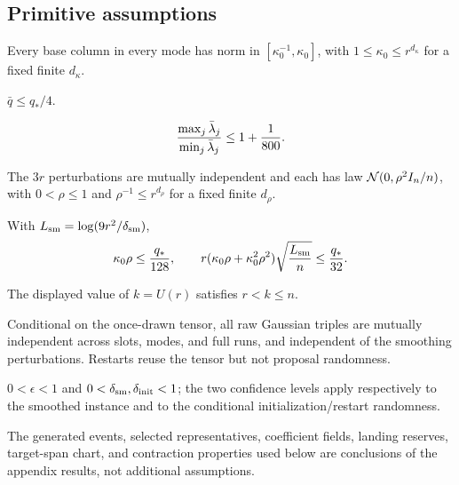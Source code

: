 \subsection{Primitive assumptions}

\begin{assumption}\label{assump:base-scale}
Every base column in every mode has norm in
$[\kappa _0^{-1},\kappa _0]$, with
$1\le\kappa _0\le r^{d_\kappa}$ for a fixed finite $d_\kappa$.
\end{assumption}

\begin{assumption}\label{assump:cumulative-gram}
$\bar q\le q_*/4$.
\end{assumption}

\begin{assumption}\label{assump:base-weight-balance}
\[
 {\max_j\bar\lambda_j\over\min_j\bar\lambda_j}\le1+{1\over800}.
\]
\end{assumption}

\begin{assumption}\label{assump:gaussian-smoothing}
The $3r$ perturbations are mutually independent and each has law
${\cal N}(0,\rho^2I_n/n)$, with $0<\rho\le1$ and
$\rho^{-1}\le r^{d_\rho}$ for a fixed finite $d_\rho$.
\end{assumption}

\begin{assumption}\label{assump:smoothing-margin}
With $L_{\rm sm}=\log(9r^2/\delta_{\rm sm})$,
\[
 \kappa _0\rho\le {q_*\over128},\qquad
 r(\kappa _0\rho+\kappa _0^2\rho^2)
 \sqrt{\frac{L_{\rm sm}}n}\le {q_*\over32}.
\]
\end{assumption}

\begin{assumption}\label{assump:subquadratic-rank}
The displayed value of $k=U(r)$ satisfies $r<k\le n$.
\end{assumption}

\begin{assumption}\label{assump:random-initialization}
Conditional on the once-drawn tensor, all raw Gaussian triples are mutually
independent across slots, modes, and full runs, and independent of the
smoothing perturbations. Restarts reuse the tensor but not proposal
randomness.
\end{assumption}

\begin{assumption}\label{assump:accuracy-confidence}
$0<\epsilon<1$ and $0<\delta_{\rm sm},\delta_{\rm init}<1$; the two
confidence levels apply respectively to the smoothed instance and to the
conditional initialization/restart randomness.
\end{assumption}

The generated events, selected representatives, coefficient fields, landing
reserves, target-span chart, and contraction properties used below are
conclusions of the appendix results, not additional assumptions.

